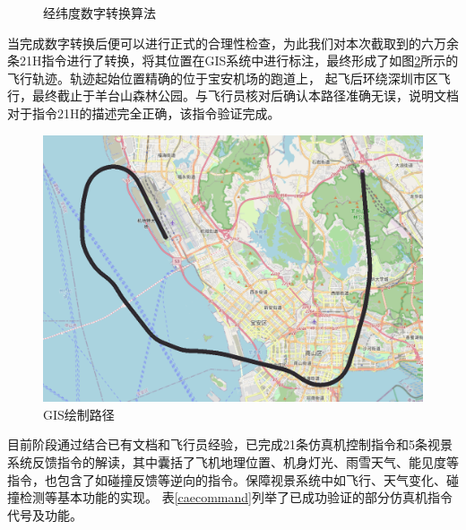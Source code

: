 \begin{figure}[h!]
    \centering
     
    \caption{经纬度数字转换算法}
    \label{llconv}
\end{figure}
\par
当完成数字转换后便可以进行正式的合理性检查，为此我们对本次截取到的六万余条21H指令进行了转换，将其位置在GIS系统中进行标注，最终形成了如图\ref{GIStrace}所示的飞行轨迹。轨迹起始位置精确的位于宝安机场的跑道上，
起飞后环绕深圳市区飞行，最终截止于羊台山森林公园。与飞行员核对后确认本路径准确无误，说明文档对于指令21H的描述完全正确，该指令验证完成。
\begin{figure}[h!]
    \begin{center}
        \includegraphics[width=.9\textwidth]{pictures/trace.png}
        \caption{GIS绘制路径}
        \label{GIStrace}
    \end{center}
\end{figure}
\par
目前阶段通过结合已有文档和飞行员经验，已完成21条仿真机控制指令和5条视景系统反馈指令的解读，其中囊括了飞机地理位置、机身灯光、雨雪天气、能见度等指令，也包含了如碰撞反馈等逆向的指令。保障视景系统中如飞行、天气变化、碰撞检测等基本功能的实现。
表\ref{caecommand}列举了已成功验证的部分仿真机指令代号及功能。
